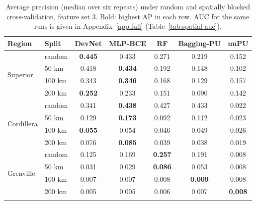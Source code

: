 \documentclass[pdflatex,sn-apa]{sn-jnl}
\begin{document}
\begin{table}[t]
\caption{Average precision (median over six repeats) under random and spatially blocked cross-validation, feature set 3. Bold: highest AP in each row. AUC for the same runs is given in Appendix~\ref{app:full} (Table~\ref{tab:spatial-auc}).}\label{tab:spatial}
\footnotesize
\setlength{\tabcolsep}{3pt}
\begin{tabular*}{\textwidth}{@{\extracolsep\fill}llccccc}
\toprule
Region & Split & DevNet & MLP-BCE & RF & Bagging-PU & nnPU \\
\midrule
\multirow{4}{*}{Superior} & random & \textbf{0.445} & 0.433 & 0.271 & 0.219 & 0.152 \\
 & 50 km & 0.418 & \textbf{0.434} & 0.192 & 0.148 & 0.102 \\
 & 100 km & 0.343 & \textbf{0.346} & 0.168 & 0.129 & 0.157 \\
 & 200 km & \textbf{0.252} & 0.233 & 0.151 & 0.090 & 0.142 \\
\midrule
\multirow{4}{*}{Cordillera} & random & 0.341 & \textbf{0.438} & 0.427 & 0.433 & 0.022 \\
 & 50 km & 0.129 & \textbf{0.173} & 0.092 & 0.112 & 0.023 \\
 & 100 km & \textbf{0.055} & 0.054 & 0.046 & 0.049 & 0.026 \\
 & 200 km & 0.076 & \textbf{0.085} & 0.039 & 0.038 & 0.019 \\
\midrule
\multirow{4}{*}{Grenville} & random & 0.125 & 0.169 & \textbf{0.257} & 0.191 & 0.008 \\
 & 50 km & 0.031 & 0.029 & \textbf{0.086} & 0.053 & 0.008 \\
 & 100 km & 0.007 & 0.007 & 0.008 & \textbf{0.009} & 0.008 \\
 & 200 km & 0.005 & 0.005 & 0.006 & 0.007 & \textbf{0.008} \\
\botrule
\end{tabular*}
\end{table}
\end{document}
